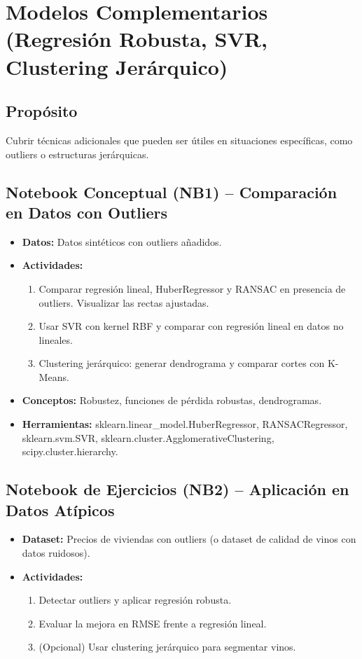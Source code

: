 \documentclass[12pt,a4paper]{article}
\begin{document}
\section{Modelos Complementarios (Regresión Robusta, SVR, Clustering Jerárquico)}
\subsection*{Propósito}
Cubrir técnicas adicionales que pueden ser útiles en situaciones específicas, como outliers o estructuras jerárquicas.

\subsection*{Notebook Conceptual (NB1) – Comparación en Datos con Outliers}
\begin{itemize}
    \item \textbf{Datos:} Datos sintéticos con outliers añadidos.
    \item \textbf{Actividades:}
    \begin{enumerate}
        \item Comparar regresión lineal, HuberRegressor y RANSAC en presencia de outliers. Visualizar las rectas ajustadas.
        \item Usar SVR con kernel RBF y comparar con regresión lineal en datos no lineales.
        \item Clustering jerárquico: generar dendrograma y comparar cortes con K-Means.
    \end{enumerate}
    \item \textbf{Conceptos:} Robustez, funciones de pérdida robustas, dendrogramas.
    \item \textbf{Herramientas:} sklearn.linear\_model.HuberRegressor, RANSACRegressor, sklearn.svm.SVR, sklearn.cluster.AgglomerativeClustering, scipy.cluster.hierarchy.
\end{itemize}

\subsection*{Notebook de Ejercicios (NB2) – Aplicación en Datos Atípicos}
\begin{itemize}
    \item \textbf{Dataset:} Precios de viviendas con outliers (o dataset de calidad de vinos con datos ruidosos).
    \item \textbf{Actividades:}
    \begin{enumerate}
        \item Detectar outliers y aplicar regresión robusta.
        \item Evaluar la mejora en RMSE frente a regresión lineal.
        \item (Opcional) Usar clustering jerárquico para segmentar vinos.
    \end{enumerate}
\end{itemize}
\end{document}
